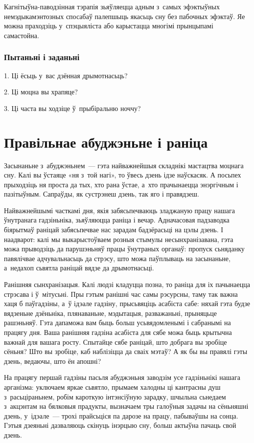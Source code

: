 Кагнітыўна-паводзінная тэрапія зьяўляецца адным з~самых эфэктыўных немэдыкамэнтозных спосабаў палепшыць якасьць сну без пабочных эфэктаў. Яе можна праходзіць у~спэцыяліста або карыстацца многімі прынцыпамі самастойна.

\subsubsection{Пытаньні і заданьні}

1. Ці ёсьць у~вас дзённая дрымотнасьць?

2. Ці моцна вы храпяце?

3. Ці часта вы ходзіце ў~прыбіральню ноччу?


\section{Правільнае абуджэньне і раніца}

Засынаньне з~абуджэньнем~--- гэта найважнейшыя складнікі мастацтва моцнага сну. Калі вы ўстаяце «ня з~той нагі», то ўвесь дзень ідзе наўскасяк. А посьпех прыходзіць ня проста да тых, хто рана ўстае, а~хто прачынаецца энэргічным і пазітыўным. Сапраўды, як сустрэнеш дзень, так яго і правядзеш.

Найважнейшымі часткамі дня, якія забясьпечваюць зладжаную працу нашага ўнутранага гадзіньніка, зьяўляюцца раніца і вечар. Адначасовая падзаводка біярытмаў раніцай забясьпечвае нас зарадам бадзёрасьці на цэлы дзень. І наадварот: калі мы выкарыстоўваем розныя стымулы несынхранізавана, гэта можа прыводзіць да парушэньняў працы ўнутраных органаў: пропуск сьняданку павялічвае адчувальнасьць да стрэсу, што можа паўплываць на засынаньне, а~недахоп сьвятла раніцай вядзе да дрымотнасьці.

Ранішняя сынхранізацыя. Калі людзі кладуцца позна, то раніца для іх пачынаецца стрэсава і ў~мітусьні. Пры гэтым ранішні час самы рэсурсны, таму так важна хаця б паўгадзіны, а~ў ідэале гадзіну, прысьвяціць асабіста сабе: няхай гэта будзе вядзеньне дзёньніка, плянаваньне, мэдытацыя, разважаньні, прыняцьце рашэньняў. Гэта дапаможа вам быць больш усьвядомленымі і сабранымі на працягу дня. Ваша ранішняя гадзіна асабіста для сябе можа быць крытычна важнай для вашага росту. Спытайце сябе раніцай, што добрага вы зробіце сёньня? Што вы зробіце, каб наблізіцца да сваіх мэтаў? А як бы вы правялі гэты дзень, ведаючы, што ён апошні?

На працягу першай гадзіны пасьля абуджэньня заводзім усе гадзіньнікі нашага арганізма: уключаем яркае сьвятло, прымаем халодны ці кантрасны душ з~расьціраньнем, робім кароткую інтэнсіўную зарадку, шчыльна сьнедаем з~акцэнтам на бялковыя прадукты, вызначаем тры галоўныя задачы на сёньняшні дзень, у~ідэале~--- трохі прайсьціся па дарозе на працу, пабываўшы на сонца. Гэтыя дзеяньні дазваляюць скінуць інэрцыю сну, больш актыўна пачаць свой дзень.

